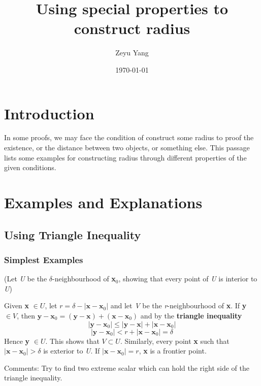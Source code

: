 \documentclass[titlepage,a4paper,12pt]{article}
\theoremstyle{nonumberplain}
\begin{document}
    \title{\textbf{Using special properties to construct radius}}
    \author{Zeyu Yang}
    \date{\today}
    \maketitle
\section{Introduction}
In some proofs, we may face the condition of construct some radius to proof the existence, or the distance between two objects, or something else. This passage lists some examples for constructing radius through different properties of the given conditions.\par
\section{Examples and Explanations}
\subsection{Using Triangle Inequality}

\subsubsection {\textbf{Simplest Examples}}(Let \emph{U} be the $\delta$-neighbourhood of \textbf{x}$_0$, showing that every point of \emph{U} is interior to \emph{U})\par
Given \textbf{x} $\in U$, let $r=\delta -|\textbf{x}-\textbf{x}_0|$ and let \emph{V} be the \emph{r}-neighbourhood of \textbf{x}. If \textbf{y} $\in V$, then $\textbf{y}-\textbf{x}_0=(\textbf{y}-\textbf{x})+(\textbf{x}-\textbf{x}_0)$ and by the \textbf{triangle inequality}
$$|\textbf{y}-\textbf{x}_0|\leq |\textbf{y}-\textbf{x}|+|\textbf{x}-\textbf{x}_0|$$
$$|\textbf{y}-\textbf{x}_0|<r+|\textbf{x}-\textbf{x}_0|=\delta$$
Hence \textbf{y} $\in U$. This shows that $V\subset U$. Similarly, every point \textbf{x} such that $|\textbf{x}-\textbf{x}_0|>\delta$ is exterior to \emph{U}. If $|\textbf{x}-\textbf{x}_0|=r$, \textbf{x} is a frontier point.\par
Comments: Try to find two extreme scalar which can hold the right side of the triangle inequality.\par
\end{document}
